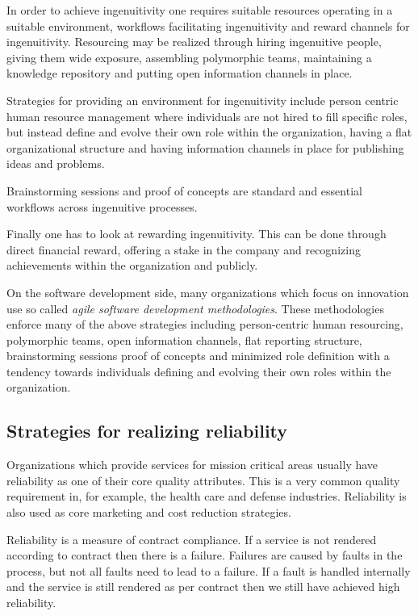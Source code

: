 \documentclass[11pt,english,a4]{article}
\begin{document}
In order to achieve ingenuitivity one requires suitable resources operating in a suitable environment, workflows facilitating ingenuitivity and reward channels for ingenuitivity. Resourcing may be realized through hiring ingenuitive people, giving them wide exposure, assembling polymorphic teams, maintaining a knowledge repository and putting open information channels in place.

Strategies for providing an environment for ingenuitivity include person centric human resource management where individuals are not hired to fill specific roles, but instead define and evolve their own role within the organization, having a flat organizational structure and having information channels in place for publishing ideas and problems.

Brainstorming sessions and proof of concepts are standard and essential workflows across ingenuitive processes.

Finally one has to look at rewarding ingenuitivity. This can be done through direct financial reward, offering a stake in the company and recognizing achievements within the organization and publicly.

On the software development side, many organizations which focus on innovation use so called {\em{agile software development methodologies}}. These methodologies enforce many of the above strategies including person-centric human resourcing, polymorphic teams, open information channels, flat reporting structure, brainstorming sessions proof of concepts and minimized role definition with a tendency towards individuals defining and evolving their own roles within the organization.

\subsection{Strategies for realizing reliability}

Organizations which provide services for mission critical areas usually have reliability as one of their core quality attributes. This is a very common quality requirement in, for example, the health care and defense industries. Reliability is also used as core marketing and cost reduction strategies.

Reliability is a measure of contract compliance. If a service is not rendered according to contract then there is a failure. Failures are caused by faults in the process, but not all faults need to lead to a failure. If a fault is handled internally and the service is still rendered as per contract then we still have achieved high reliability.
\end{document}
